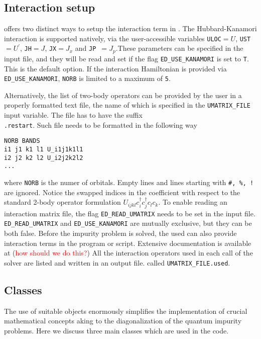 \documentclass[edipack2.tex]{subfiles}
\begin{document}
\subsection{Interaction setup}
\NAME offers two distinct ways to setup the interaction term in . 
The Hubbard-Kanamori interaction  is supported natively, via the user-accessible
variables {\tt ULOC}$=U$, {\tt UST}$=U^{'}$, {\tt JH}$=J$, {\tt JX}$=J_{x}$ and {\tt JP
}$=J_{p}$.These parameters can be specified in the input file, and they will be read and 
set if the flag {\tt ED\_USE\_KANAMORI} is set to {\tt T}. This is the default option.
If the interaction Hamiltonian is provided via {\tt ED\_USE\_KANAMORI}, {\tt NORB} is limited to a maximum of {\tt 5}.

Alternatively, the list of two-body operators can be provided by the user in a properly
formatted text file, the name of which is specified in the {\tt UMATRIX\_FILE} input variable. The file has to have the suffix {\tt \\.restart}.
Such file needs to be formatted in the following way

\begin{lstlisting}[style=mybash]
NORB BANDS
i1 j1 k1 l1 U_i1j1k1l1
i2 j2 k2 l2 U_i2j2k2l2
...
\end{lstlisting}

where {\tt NORB} is the numer of orbitals. Empty lines and lines starting with {\tt \#, \%, !} are ignored. Notice the swapped indices in the coefficient with respect to the standard 2-body operator formulation $U_{ijkl}c^{\dagger}_{i}c^{\dagger}_{j}c_{l}c_{k}$. To enable reading an interaction matrix file, the flag {\tt ED\_READ\_UMATRIX} needs to be set in the input file. {\tt ED\_READ\_UMATRIX} and {\tt ED\_USE\_KANAMORI} are mutually exclusive, but they can be both false.
Before the impurity problem is solved, the used can also provide interaction terms in the program or script. Extensive documentation is available at (\textcolor{red}{how should we do this?})
All the interaction operators used in each call of the solver are listed and written in an output file. called {\tt UMATRIX\_FILE.used}.

\subsection{Classes}
The use of suitable objects enormously simplifies the  implementation
of crucial mathematical concepts aking to the diagonalization of the
quantum impurity problems. Here we discuss three main classes which
are used in the code.    
\end{document}
